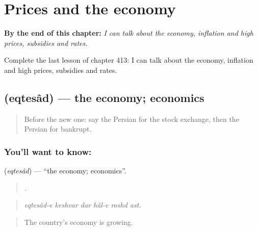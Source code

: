 
\chapter{Prices and the economy}
\label{ch:fa-prices-and-the-economy}

\begin{chapteropening}
\textbf{By the end of this chapter:} \emph{I can talk about the economy, inflation and high prices, subsidies and rates.}

Complete the last lesson of chapter 413: I can talk about the economy, inflation and high prices, subsidies and rates.
\end{chapteropening}

\section[\texorpdfstring{\fa{اقتصاد} (eqtesâd)}{اقتصاد (eqtesâd)}]{ (eqtesâd) — the economy; economics}

\label{lesson:FA-C413-eqtesad}



\begin{quote}
Before the new one: say the Persian for the stock exchange, then the Persian for bankrupt.
\end{quote}

\subsection*{You'll want to know: }
\textbf{} (\emph{eqtesâd}) — \textquotedblleft{}the economy; economics\textquotedblright{}.

\begin{quote}
     .
\end{quote}

\begin{quote}
\emph{eqtesâd-e keshvar dar hâl-e roshd ast.}
\end{quote}

\begin{quote}
The country's economy is growing.
\end{quote}

